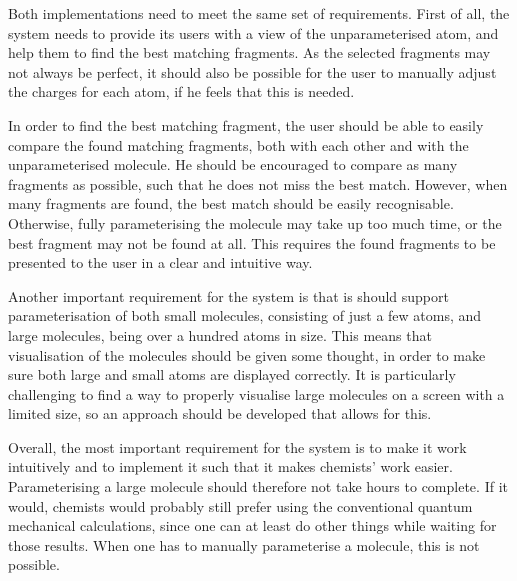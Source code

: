 Both implementations need to meet the same set of requirements. First of all, the system needs to provide its users with a view of the unparameterised atom, and help them to find the best matching fragments. As the selected fragments may not always be perfect, it should also be possible for the user to manually adjust the charges for each atom, if he feels that this is needed.

In order to find the best matching fragment, the user should be able to easily compare the found matching fragments, both with each other and with the unparameterised molecule. He should be encouraged to compare as many fragments as possible, such that he does not miss the best match. However, when many fragments are found, the best match should be easily recognisable. Otherwise, fully parameterising the molecule may take up too much time, or the best fragment may not be found at all. This requires the found fragments to be presented to the user in a clear and intuitive way.

Another important requirement for the system is that is should support parameterisation of both small molecules, consisting of just a few atoms, and large molecules, being over a hundred atoms in size. This means that visualisation of the molecules should be given some thought, in order to make sure both large and small atoms are displayed correctly. It is particularly challenging to find a way to properly visualise large molecules on a screen with a limited size, so an approach should be developed that allows for this.

Overall, the most important requirement for the system is to make it work intuitively and to implement it such that it makes chemists' work easier. Parameterising a large molecule should therefore not take hours to complete. If it would, chemists would probably still prefer using the conventional quantum mechanical calculations, since one can at least do other things while waiting for those results. When one has to manually parameterise a molecule, this is not possible.
